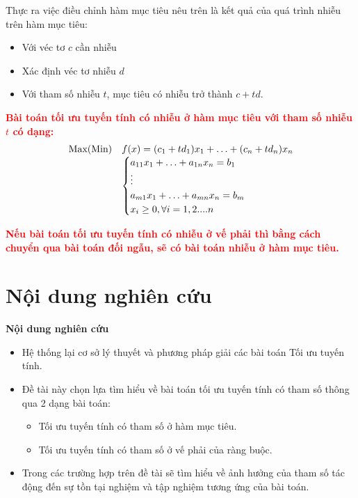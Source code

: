 \documentclass{beamer}
\begin{document}
\begin{frame}
Thực ra việc điều chỉnh hàm mục tiêu nêu trên là kết quả của quá trình nhiễu trên hàm mục tiêu:
\begin{itemize}
\item Với véc tơ $c$ cần nhiễu
\item Xác định véc tơ nhiễu $d$
\item Với tham số nhiễu $t$, mục tiêu có nhiễu trở thành $c+td$.
\end{itemize}
\textcolor{red}{\bf Bài toán tối ưu tuyến tính có nhiễu ở hàm mục tiêu với tham số nhiễu $t$ có dạng:}
$$
    \begin{array}{lll}            
        {\rm Max (Min)}&f(x)=(c_1+td_1)x_1+\ldots+(c_n+td_n)x_n\\
            & \begin{cases}
            a_{11}x_1+\ldots+a_{1n}x_n =  b_1 \\
            \vdots\\
            a_{m1}x_1+\ldots+a_{mn}x_n =  b_m\\
            x_i\geq 0,\forall i=1,2....n
           \end{cases} 
     \end{array}
$$ 

\textcolor{red}{\bf Nếu bài toán tối ưu tuyến tính có nhiễu ở vế phải thì bằng cách chuyển qua bài toán đối ngẫu, sẽ có bài toán nhiễu ở hàm mục tiêu.}
\end{frame}



\section{Nội dung nghiên cứu}
\begin{frame}{\bf Nội dung nghiên cứu}
    \begin{itemize}
    \item Hệ thống lại cơ sở lý thuyết và phương pháp giải các bài toán Tối ưu tuyến tính.
    \item Đề tài này chọn lựa tìm hiểu về bài toán tối ưu tuyến tính có tham số thông qua 2 dạng bài toán:
    \begin{itemize}
    \item Tối ưu tuyến tính có tham số ở hàm mục tiêu.
    \item Tối ưu tuyến tính có tham số ở vế phải của ràng buộc.
    \end{itemize}
    \item Trong các trường hợp trên đề tài sẽ tìm hiểu về ảnh hưởng  của tham số tác động đến sự tồn tại nghiệm và tập nghiệm tương ứng của bài toán.
    \end{itemize}
\end{frame}
\end{document}
